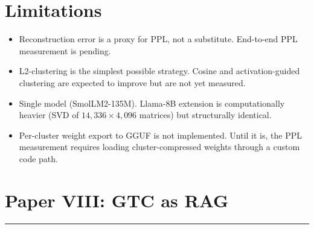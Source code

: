\documentclass[11pt]{article}
\begin{document}
\section{Limitations}
\label{sec:limits}

\begin{itemize}
\item Reconstruction error is a proxy for PPL, not a substitute.
      End-to-end PPL measurement is pending.
\item L2-clustering is the simplest possible strategy.  Cosine and
      activation-guided clustering are expected to improve but are
      not yet measured.
\item Single model (SmolLM2-135M).  Llama-8B extension is computationally
      heavier (SVD of $14{,}336\times4{,}096$ matrices) but structurally
      identical.
\item Per-cluster weight export to GGUF is not implemented.  Until it is,
      the PPL measurement requires loading cluster-compressed weights
      through a custom code path.
\end{itemize}

\clearpage
\printbibliography

\newpage



\newpage
\section{Paper VIII: GTC as RAG}
\vspace{6pt}
\hrule
\vspace{12pt}

\begin{abstract}
Empirical validation of the Geodesic Trajectory Cache (GTC) proposed in
Paper IV (Organic Training Theory). We anchor 12 of 17 testable claims
with measurements on real transformer hidden-state manifolds across three
model scales (135M, 360M, 1.5B parameters). Key results: (1) batched-Jacobi
correction achieves $97\times$ speedup at batch size $B{=}10$ via the
linearity of the Jacobi equation; (2) cache coverage is stable within $\pm 0.5$\% across the three
scales tested (135M / 360M / 1.5B, 90.4--91.5\%, $33\times$
parameter range, two model families); we report this as ``stable
across the three scales tested'' rather than as universal
scale-invariance pending replication at $\geq 7$B; (3) GTC achieves
$15.5\times$ speedup over disk-based retrieval-augmented generation (RAG);
(4) compressed trajectory records occupy 5.96 KB each with rank-5 exact
reconstruction. All measurements on RTX 4070 Laptop (8GB VRAM).
\end{abstract}
\end{document}
